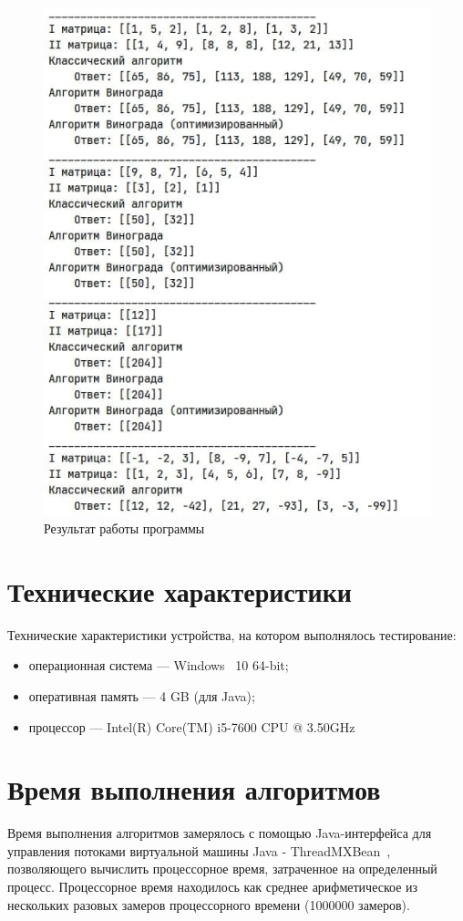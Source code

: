 \documentclass[12pt]{report}
\begin{document}
    \begin{figure}[H]
        \centering
        \includegraphics[width=0.7\linewidth]{img/example2}
        \caption{Результат работы программы}
        \label{fig:work_example3}
    \end{figure}


    \section{Технические характеристики}
    Технические характеристики устройства, на котором выполнялось тестирование:
    \begin{itemize}
        \item операционная система --- Windows~\cite{windows} 10 64-bit;
        \item оперативная память --- 4 GB (для Java);
        \item процессор --- Intel(R) Core(TM) i5-7600 CPU @ 3.50GHz~\cite{i5}
    \end{itemize}


    \section{Время выполнения алгоритмов}
    Время выполнения алгоритмов замерялось с помощью Java-интерфейса для управления потоками
    виртуальной машины Java - ThreadMXBean~\cite{threadMXBean}, позволяющего вычислить процессорное время,
    затраченное на определенный процесс.
    Процессорное время находилось как среднее арифметическое
    из нескольких разовых замеров процессорного времени (1000000 замеров).
\end{document}
